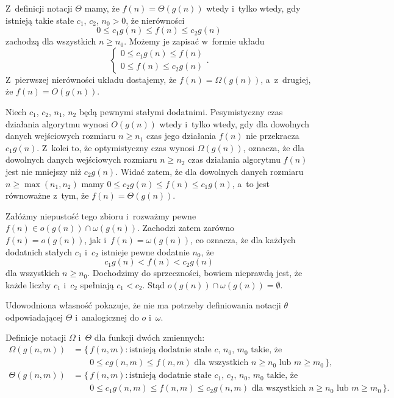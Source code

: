 \exercise %
Z~definicji notacji $\Theta$ mamy, że $f(n)=\Theta(g(n))$ wtedy i~tylko wtedy, gdy istnieją takie stałe $c_1$, $c_2$, $n_0>0$, że nierówności
\[
	0 \le c_1g(n) \le f(n) \le c_2g(n)
\]
zachodzą dla wszystkich $n\ge n_0$.
Możemy je zapisać w~formie układu
\[
	\begin{cases}
		0 \le c_1g(n) \le f(n) \\
		0 \le f(n) \le c_2g(n)
	\end{cases}.
\]
Z~pierwszej nierówności układu dostajemy, że $f(n)=\Omega(g(n))$, a~z~drugiej, że $f(n)=O(g(n))$.

\exercise %
Niech $c_1$, $c_2$, $n_1$, $n_2$ będą pewnymi stałymi dodatnimi.
Pesymistyczny czas działania algorytmu wynosi $O(g(n))$ wtedy i~tylko wtedy, gdy dla dowolnych danych wejściowych rozmiaru $n\ge n_1$ czas jego działania $f(n)$ nie przekracza $c_1g(n)$.
Z~kolei to, że optymistyczny czas wynosi $\Omega(g(n))$, oznacza, że dla dowolnych danych wejściowych rozmiaru $n\ge n_2$ czas działania algorytmu $f(n)$ jest nie mniejszy niż $c_2g(n)$.
Widać zatem, że dla dowolnych danych rozmiaru $n\ge\max(n_1,n_2)$ mamy $0\le c_2g(n)\le f(n)\le c_1g(n)$, a~to jest równoważne z~tym, że $f(n)=\Theta(g(n))$.

\exercise %
Załóżmy niepustość tego zbioru i~rozważmy pewne $f(n)\in o(g(n))\cap\omega(g(n))$.
Zachodzi zatem zarówno $f(n)=o(g(n))$, jak i~$f(n)=\omega(g(n))$, co oznacza, że dla każdych dodatnich stałych $c_1$ i~$c_2$ istnieje pewne dodatnie $n_0$, że
\[
	c_1g(n) < f(n) < c_2g(n)
\]
dla wszystkich $n\ge n_0$.
Dochodzimy do sprzeczności, bowiem nieprawdą jest, że każde liczby $c_1$ i~$c_2$ spełniają $c_1<c_2$.
Stąd $o(g(n))\cap\omega(g(n))=\emptyset$.

Udowodniona własność pokazuje, że nie ma potrzeby definiowania notacji $\theta$ odpowiadającej $\Theta$ i~analogicznej do $o$ i~$\omega$.

\exercise %

\noindent Definicje notacji $\Omega$ i~$\Theta$ dla funkcji dwóch zmiennych:
\[
	\begin{split}
		\Omega(g(n,m)) &= \bigl\{\,f(n,m):\text{istnieją dodatnie stałe $c$, $n_0$, $m_0$ takie, że} \\
		&\qquad 0 \le cg(n,m) \le f(n,m) \text{ dla wszystkich $n \ge n_0$ lub $m \ge m_0$}\,\bigr\}, \\[2mm]
		\Theta(g(n,m)) &= \bigl\{\,f(n,m):\text{istnieją dodatnie stałe $c_1$, $c_2$, $n_0$, $m_0$ takie, że} \\
		&\qquad 0 \le c_1g(n,m) \le f(n,m) \le c_2g(n,m) \text{ dla wszystkich $n \ge n_0$ lub $m \ge m_0$}\,\bigr\}.
	\end{split}
\]
